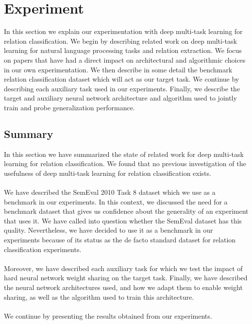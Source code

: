 \chapter{Experiment}
\label{experiment}
In this section we explain our experimentation with deep multi-task learning for relation classification. We begin by describing related work on deep multi-task learning for natural language processing tasks and relation extraction. We focus on papers that have had a direct impact on architectural and algorithmic choices in our own experimentation. We then describe in some detail the benchmark relation classification dataset which will act as our target task. We continue by describing each auxiliary task used in our experiments. Finally, we describe the target and auxiliary neural network architecture and algorithm used to jointly train and probe generalization performance.






\section{Summary}
In this section we have summarized the state of related work for deep multi-task learning for relation classification. We found that no previous investigation of the usefulness of deep multi-task learning for relation classification exists. 
\\\\
We have described the SemEval 2010 Task 8 dataset which we use as a benchmark in our experiments. In this context, we discussed the need for a benchmark dataset that gives us confidence about the generality of an experiment that uses it. We have called into question whether the SemEval dataset has this quality. Nevertheless, we have decided to use it as a benchmark in our experiments because of its status as the de facto standard dataset for relation classification experiments.
\\\\
Moreover, we have described each auxiliary task for which we test the impact of hard neural network weight sharing on the target task. Finally, we have described the neural network architectures used, and how we adapt them to enable weight sharing, as well as the algorithm used to train this architecture.
\\\\
We continue by presenting the results obtained from our experiments.